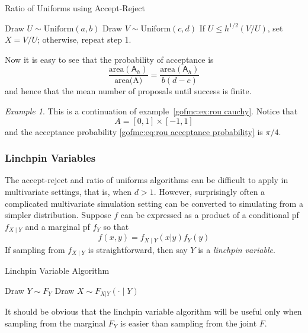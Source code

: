 \documentclass[12pt]{article}
\theoremstyle{plain}
\theoremstyle{definition}
\theoremstyle{remark}
\newtheorem{example}{Example}[section]
\newcommand{\sA}{\mathsf{A}}
\begin{document}
\begin{algorithm}[H]
 \caption{Ratio of Uniforms using Accept-Reject} \label{gofmc:alg:rou-ar}
 \begin{algorithmic}[1]
   \State Draw $U\sim \text{Uniform}(a,b)$
   \State Draw $V \sim \text{Uniform}(c,d)$
 \State If $U \le h^{1/2}(V/U)$, set $X=V/U$; otherwise, repeat step 1.
 \end{algorithmic}
\end{algorithm}

Now it is easy to see that the probability of acceptance is
\begin{equation}
\label{gofmc:eq:rou acceptance probability}
\frac{\text{area}(\sA_h)}{\text{area(A)}}=\frac{\text{area}(\sA_h)}{b(d-c)} 
\end{equation}
and hence that the mean number of proposals until success is finite.

\begin{example}
This is a continuation of example~\ref{gofmc:ex:rou cauchy}.  Notice that
$$
A=[0,1] \times [-1,1] 
$$
and the acceptance probability \eqref{gofmc:eq:rou acceptance
  probability} is $\pi / 4$.
\end{example}

\subsubsection{Linchpin Variables}
\label{gofmc:sec:linchpin variables}

The accept-reject and ratio of uniforms algorithms can be difficult to
apply in multivariate settings, that is, when $d > 1$. However,
surprisingly often a complicated multivariate simulation setting can
be converted to simulating from a simpler distribution.  Suppose $f$
can be expressed as a product of a conditional pf $f_{X \mid Y}$ and
a marginal pf $f_{Y}$ so that
\[
f(x, y) = f_{X \mid Y}(x|y) f_{Y}(y)
\]
If sampling from $f_{X \mid Y}$ is straightforward, then say $Y$ is a
{\em linchpin variable}.

\begin{algorithm}[H]
 \caption{Linchpin Variable Algorithm} \label{gofmc:alg:lv}
 \begin{algorithmic}[1]
   \State Draw $Y \sim F_Y$ 
   \State Draw $X \sim F_{X|Y}(\cdot \mid Y)$
 \end{algorithmic}
\end{algorithm}

It should be obvious that the linchpin variable algorithm will be
useful only when sampling from the marginal $F_Y$ is easier than
sampling from the joint $F$.
\end{document}
